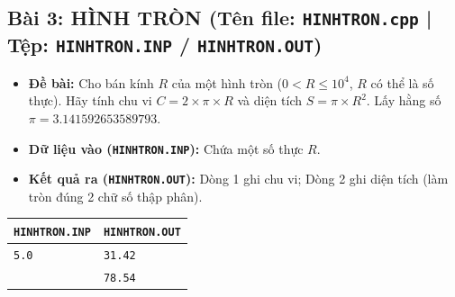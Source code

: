 \documentclass[11pt,a4paper]{article}
\begin{document}
\vspace{-2mm}
\subsection*{\color{AsianDarkBlue}\small Bài 3: HÌNH TRÒN (Tên file: \texttt{HINHTRON.cpp} | Tệp: \texttt{HINHTRON.INP} / \texttt{HINHTRON.OUT})}
\begin{itemize}
    \setlength{\itemsep}{0.5pt}
    \footnotesize
    \item \textbf{Đề bài:} Cho bán kính $R$ của một hình tròn ($0 < R \le 10^4$, $R$ có thể là số thực). Hãy tính chu vi $C = 2 \times \pi \times R$ và diện tích $S = \pi \times R^2$. Lấy hằng số $\pi = 3.141592653589793$.
    \item \textbf{Dữ liệu vào (\texttt{HINHTRON.INP}):} Chứa một số thực $R$.
    \item \textbf{Kết quả ra (\texttt{HINHTRON.OUT}):} Dòng 1 ghi chu vi; Dòng 2 ghi diện tích (làm tròn đúng 2 chữ số thập phân).
\end{itemize}
\vspace{-2mm}
\begin{center}
\footnotesize
\begin{tabular}{|p{7.8cm}|p{7.8cm}|}
\hline
\textbf{\texttt{HINHTRON.INP}} & \textbf{\texttt{HINHTRON.OUT}} \\
\hline
\texttt{5.0} & \texttt{31.42} \\
& \texttt{78.54} \\
\hline
\end{tabular}
\end{center}

\newpage

\end{document}
